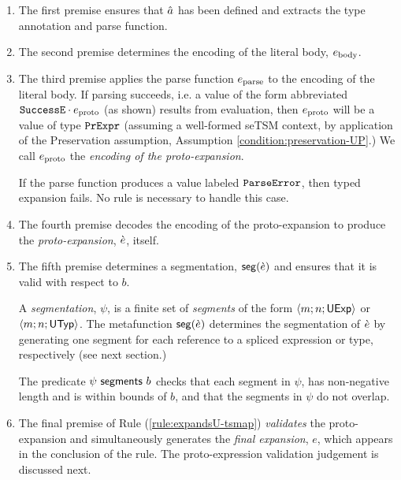 \begin{enumerate}
\item The first premise ensures that $\hat{a}$ has been defined and extracts the type annotation and parse function.
\item The second premise determines the encoding of the literal body, $e_\text{body}$.
\item The third premise applies the parse function $e_\text{parse}$ to the encoding of the literal body. If parsing succeeds, i.e. a value of the form abbreviated $\mathtt{SuccessE}\cdot e_\text{proto}$ (as shown) results from evaluation, then $e_\text{proto}$ will be a value of type $\mathtt{PrExpr}$ (assuming a well-formed seTSM context, by application of the Preservation assumption, Assumption \ref{condition:preservation-UP}.) We call $e_\text{proto}$ the \emph{encoding of the proto-expansion}.

If the parse function produces a value labeled $\mathtt{ParseError}$, then typed expansion fails. No rule is necessary to handle this case. 

\item The fourth premise decodes the encoding of the proto-expansion to produce the \emph{proto-expansion}, $\grave{e}$, itself.

\item The fifth premise determines a segmentation, $\mathsf{seg}(\grave{e})$ and ensures that it is valid with respect to $b$. 

A \emph{segmentation}, $\psi$, is a finite set of \emph{segments} of the form $\langle m; n; \mathsf{UExp} \rangle$ or $\langle m; n; \mathsf{UTyp} \rangle$. The metafunction $\mathsf{seg}(\grave{e})$ determines the segmentation of $\grave{e}$ by generating one segment for each reference to a spliced expression or type, respectively (see next section.)

The predicate $\psi~\mathsf{segments}~b$ checks that each segment in $\psi$, has non-negative length and is within bounds of $b$, and that the segments in $\psi$ do not overlap.

\item The final premise of Rule (\ref{rule:expandsU-tsmap}) \emph{validates} the proto-expansion and simultaneously generates the \emph{final expansion}, $e$, which appears in the conclusion of the rule. The proto-expression validation judgement is discussed next.
\end{enumerate}
